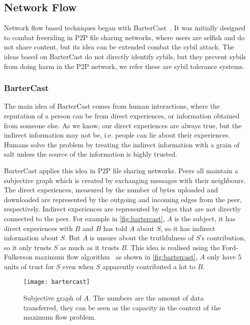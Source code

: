 
\subsection{Network Flow}\label{sec:network-flow}
Network flow based techniques began with
BarterCast~\cite{meulpolder2009bartercast}. It was initially designed to combat
freeriding in P2P file sharing networks, where users are selfish and do not
share content, but its idea can be extended combat the sybil attack. The ideas
based on BarterCast do not directly identify sybils, but they prevent sybils
from doing harm in the P2P network, we refer these are sybil tolerance systems.

\subsubsection{BarterCast}
The main idea of BarterCast comes from human interactions, where the reputation
of a person can be from direct experiences, or information obtained from someone
else. As we know, our direct experiences are always true, but the indirect
information may not be, i.e. people can lie about their experiences. Humans
solve the problem by treating the indirect information with a grain of salt
unless the source of the information is highly trusted.

BarterCast applies this idea in P2P file sharing networks. Peers all maintain a
subjective graph which is created by exchanging messages with their neighbours.
The direct experiences, measured by the number of bytes uploaded and downloaded
are represented by the outgoing and incoming edges from the peer, respectively.
Indirect experiences are represented by edges that are not directly connected to
the peer. For example in \autoref{fig:bartercast}, $A$ is the subject, it has
direct experiences with $B$ and $B$ has told $A$ about $S$, so it has indirect
information about $S$. But $A$ is unsure about the truthfulness of $S$'s
contribution, so it only trusts $S$ as much as it trusts $B$. This idea is
realised using the Ford-Fulkerson maximum flow
algorithm~\cite{thomas2001introduction} as shown in \autoref{fig:bartercast},
$A$ only have 5 units of trust for $S$ even when $S$ apparently contributed a
lot to $B$.

\begin{figure}
  \centering
  \texttt{[image: bartercast]}
  \caption{Subjective graph of $A$. The numbers are the amount of data transferred,
    they can be seen as the capacity in the context of the maximum flow
    problem.}
  \label{fig:bartercast}
\end{figure}

